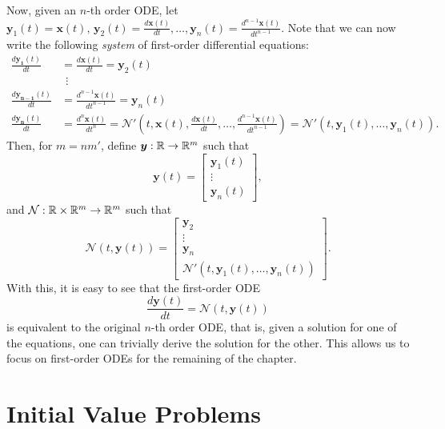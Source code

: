 Now, given an $n$-th order \gls{ODE}, let $\bm{y}_1\left( t \right) =\bm{x}\left( t \right),\,\bm{y}_2\left( t \right) = \frac{d \bm{x}\left( t \right) }{d t} ,\ldots, \bm{y}_n\left( t \right) = \frac{d^{n-1} \bm{x}\left( t \right) }{d t^{n-1}}$.
Note that we can now write the following \emph{system} of first-order differential equations:
\begin{align*}
    \frac{d \bm{y_1}\left( t \right) }{dt} &= \frac{d \bm{x}\left( t \right) }{d t} = \bm{y}_2\left( t \right) \\
    &~~\vdots \\
    \frac{d \bm{y_{n-1}}\left( t \right) }{dt} &= \frac{d^{n-1} \bm{x}\left( t \right) }{d t^{n-1}} = \bm{y}_n\left( t \right) \\
    \frac{d \bm{y_n}\left( t \right) }{dt} &= \frac{d^{n} \bm{x}\left( t \right) }{d t^{n}} = \mathcal{N}'\left( t, \bm{x}\left( t \right), \frac{d \bm{x}(t)}{d t}, \ldots,\frac{d^{n-1}\bm{x}(t)}{d t^{n-1}} \right) = \mathcal{N}'\left( t, \bm{y}_1\left( t \right), \ldots, \bm{y}_n\left( t \right) \right)
.\end{align*}
Then, for $m=n m'$, define $\bm{y}:\mathbb{R}\to \mathbb{R}^{m}$ such that \[
\bm{y}\left( t \right)  = \begin{bmatrix} 
\bm{y}_1\left( t \right) \\ \vdots \\ \bm{y}_n\left( t \right) 
\end{bmatrix} 
,\] and $\mathcal{N}:\mathbb{R}\times \mathbb{R}^{m}\to \mathbb{R}^{m}$ such that \[
    \mathcal{N}\left( t,\bm{y}\left( t \right)  \right) = \begin{bmatrix} 
    \bm{y}_2 \\ \vdots \\ \bm{y}_n \\ \mathcal{N}'\left( t, \bm{y}_1\left( t \right), \ldots, \bm{y}_n\left( t \right) \right)
    \end{bmatrix} 
.\] With this, it is easy to see that the first-order \gls{ODE}
\begin{equation}\label{eq:ode}
    \frac{d \bm{y}\left( t \right) }{d t} = \mathcal{N}\left( t, \bm{y}\left( t \right)  \right) 
\end{equation}
is equivalent to the original $n$-th order \gls{ODE}, that is, given a solution for one of the equations, one can trivially derive the solution for the other.
This allows us to focus on first-order \gls{ODE}s for the remaining of the chapter.

\section{Initial Value Problems}

